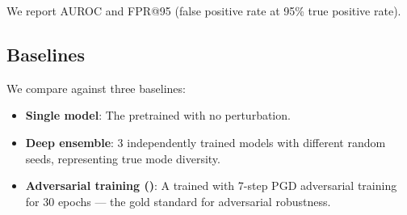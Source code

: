 We report AUROC and FPR@95 (false positive rate at 95\% true positive rate).

\subsection{Baselines}

We compare against three baselines:
\begin{itemize}[leftmargin=*,itemsep=0pt,topsep=0pt]
    \item \textbf{Single model}: The pretrained \resnet with no perturbation.
    \item \textbf{Deep ensemble}: 3 independently trained \resnet models with different random seeds, representing true mode diversity.
    \item \textbf{Adversarial training (\pgdat)}: A \resnet trained with 7-step PGD adversarial training for 30 epochs --- the gold standard for adversarial robustness.
\end{itemize}
